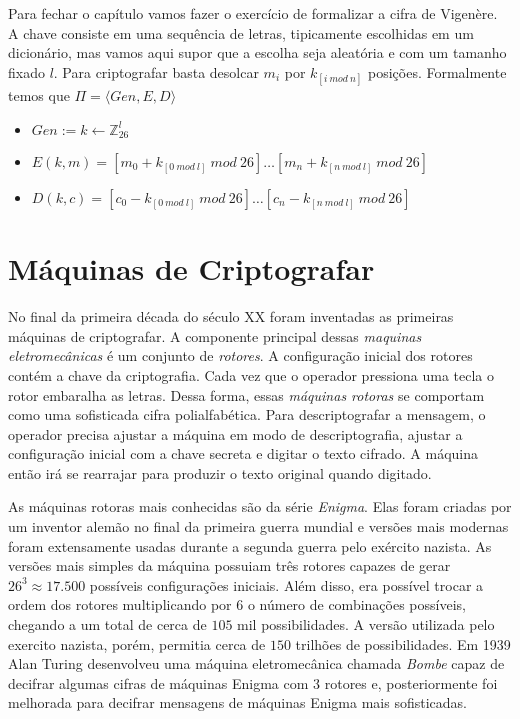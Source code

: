 Para fechar o capítulo vamos fazer o exercício de formalizar a cifra de Vigenère.
A chave consiste em uma sequência de letras, tipicamente escolhidas em um dicionário, mas vamos aqui supor que a escolha seja aleatória e com um tamanho fixado $l$.
Para criptografar basta desolcar $m_i$ por $k_{[i\ mod\ n]}$ posições.
Formalmente temos que $\Pi = \langle Gen, E, D \rangle$

\begin{itemize}
\item $Gen := k \leftarrow \mathbb{Z}_{26}^l$
\item $E(k, m) = [m_0 + k_{[0\ mod\ l]}\ mod\ 26] \dots [m_n + k_{[n\ mod\ l]}\ mod\ 26]$
\item $D(k, c) = [c_0 - k_{[0\ mod\ l]}\ mod\ 26] \dots [c_n - k_{[n\ mod\ l]}\ mod\ 26]$
\end{itemize}

\section{Máquinas de Criptografar}
\label{sec:maquinas}

No final da primeira década do século XX foram inventadas as primeiras máquinas de criptografar.
A componente principal dessas {\em maquinas eletromecânicas} é um conjunto de {\em rotores}.
A configuração inicial dos rotores contém a chave da criptografia.
Cada vez que o operador pressiona uma tecla o rotor embaralha as letras.
Dessa forma, essas {\em máquinas rotoras} se comportam como uma sofisticada cifra polialfabética.
Para descriptografar a mensagem, o operador precisa ajustar a máquina em modo de descriptografia, ajustar a configuração inicial com a chave secreta e digitar o texto cifrado.
A máquina então irá se rearrajar para produzir o texto original quando digitado.

As máquinas rotoras mais conhecidas são da série {\em Enigma}.
Elas foram criadas por um inventor alemão no final da primeira guerra mundial e versões mais modernas foram extensamente usadas durante a segunda guerra pelo exército nazista.
As versões mais simples da máquina possuiam três rotores capazes de gerar $26^3 \approx 17.500$ possíveis configurações iniciais.
Além disso, era possível trocar a ordem dos rotores multiplicando por $6$ o número de combinações possíveis, chegando a um total de cerca de $105$ mil possibilidades.
A versão utilizada pelo exercito nazista, porém, permitia cerca de $150$ trilhões de possibilidades.
Em 1939 Alan Turing desenvolveu uma máquina eletromecânica chamada {\em Bombe} capaz de decifrar algumas cifras de máquinas Enigma com 3 rotores e, posteriormente foi melhorada para decifrar mensagens de máquinas Enigma mais sofisticadas.


